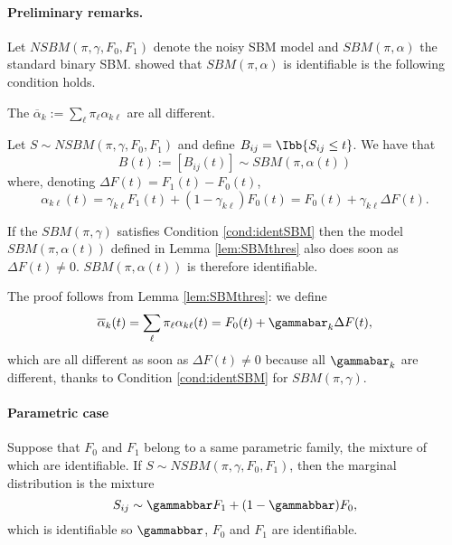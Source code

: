 \paragraph{Preliminary remarks.}
Let $NSBM(\pi, \gamma, F_0, F_1)$ denote the noisy SBM model and $SBM(\pi, \alpha)$ the standard binary SBM. \cite{CDP12} showed that $SBM(\pi, \alpha)$ is identifiable is the following condition holds.

\begin{condition} \label{cond:identSBM}
  The $\overline{\alpha}_k := \sum_\ell \pi_\ell \alpha_{k\ell}$ are all different.
\end{condition}


\begin{lemma} \label{lem:SBMthres}
 Let $S \sim NSBM(\pi, \gamma, F_0, F_1)$ and define $B_{ij} = \Ibb\{S_{ij} \leq t\}$. We have that 
 $$
 B(t) := [B_{ij}(t)] \sim SBM(\pi, \alpha(t))
 $$
 where, denoting $\Delta F(t) = F_1(t) - F_0(t)$,
 $$
 \alpha_{k\ell}(t) 
 = \gamma_{k\ell} F_1(t) + (1 - \gamma_{k\ell}) F_0(t)
 = F_0(t) + \gamma_{k\ell} \Delta F(t). 
 $$
\end{lemma}

\begin{lemma} \label{lem:identifSBMthres}
  If the $SBM(\pi, \gamma)$ satisfies Condition \ref{cond:identSBM} then the model $SBM(\pi, \alpha(t))$ defined in Lemma \ref{lem:SBMthres} also does soon as $\Delta F(t) \neq 0$. $SBM(\pi, \alpha(t))$ is therefore identifiable.
\end{lemma}

The proof follows from Lemma \ref{lem:SBMthres}: we define
$$
\overline{\alpha}_k(t) = \sum_\ell \pi_\ell \alpha_{k\ell}(t) = F_0(t) + \gammabar_k \Delta F(t),
$$
which are all different as soon as $\Delta F(t) \neq 0$ because all $\gammabar_k$ are different, thanks to Condition \ref{cond:identSBM} for $SBM(\pi, \gamma)$.

\paragraph{Parametric case}
Suppose that $F_0$ and $F_1$ belong to a same parametric family, the mixture of which are identifiable. If $S \sim NSBM(\pi, \gamma, F_0, F_1)$, then the marginal distribution is the mixture
$$
S_{ij} \sim \gammabbar F_1 + (1 - \gammabbar) F_0,
$$
which is identifiable so $\gammabbar$, $F_0$ and $F_1$ are identifiable.

